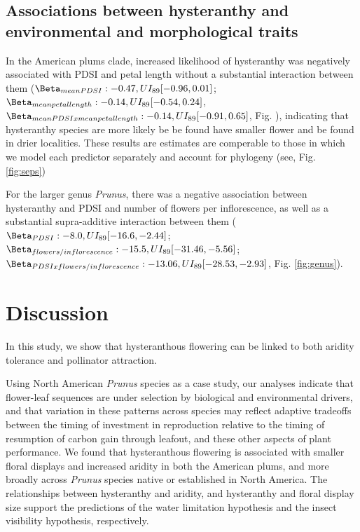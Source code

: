 \documentclass{article}[12pt]
\begin{document}
\subsection*{Associations between hysteranthy and environmental and morphological traits}
In the American plums clade, increased likelihood of hysteranthy was negatively associated with PDSI and petal length  without a substantial interaction between them ($\Beta_{mean PDSI}: -0.47, UI_{89}[-0.96,0.01]$; $\Beta_{mean petal length}: -0.14,UI_{89}[ -0.54, 0.24]$, $\Beta_{mean PDSI x mean petal length}: -0.14,UI_{89}[ -0.91, 0.65]$,  Fig. \label{fig:prunes}), indicating that hysteranthy species are more likely be be found have smaller flower and be found in drier localities. These results are estimates are comperable to those in which we model each predictor separately and account for phylogeny (see, Fig. \ref{fig:seps})

For the larger genus \emph{Prunus}, there was a negative association between hysteranthy and PDSI and number of flowers per inflorescence, as well as a substantial supra-additive interaction between them ($\Beta_{PDSI}:-8.0, UI_{89}[-16.6,-2.44]$; $\Beta_{flowers/inflorescence}: -15.5, UI_{89}[-31.46,-5.56]$; $\Beta_{PDSI x flowers/inflorescence }: -13.06, UI_{89}[-28.53,-2.93]$, Fig. \ref{fig:genus}). 

\section*{Discussion}
In this study, we show that hysteranthous flowering can be linked to both aridity tolerance and pollinator attraction.%


Using North American \textit{Prunus} species as a case study, our analyses indicate that flower-leaf sequences are under selection by biological and environmental drivers, and that variation in these patterns across species may reflect adaptive tradeoffs between the timing of investment in reproduction relative to the timing of resumption of carbon gain through leafout, and these other aspects of plant performance. We found that hysteranthous flowering is associated with smaller floral displays and increased aridity in both the American plums, and more broadly across \emph{Prunus} species native or established in North America. The relationships between hysteranthy and aridity, and hysteranthy and floral display size support the predictions of the water limitation hypothesis and the insect visibility hypothesis, respectively. 
\end{document}
